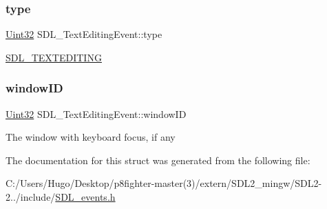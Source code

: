 \subsubsection{\texorpdfstring{type}{type}}
{\footnotesize\ttfamily \hyperlink{_s_d_l__stdinc_8h_add440eff171ea5f55cb00c4a9ab8672d}{Uint32} S\+D\+L\+\_\+\+Text\+Editing\+Event\+::type}

\hyperlink{_s_d_l__events_8h_a3b589e89be6b35c02e0dd34a55f3fccaa1b80c465df69c0b6d06f026ce7a230e3}{S\+D\+L\+\_\+\+T\+E\+X\+T\+E\+D\+I\+T\+I\+NG} \mbox{\label{struct_s_d_l___text_editing_event_a23b3e414cf7a7ccc547b7595ca930049}} 
\subsubsection{\texorpdfstring{window\+ID}{windowID}}
{\footnotesize\ttfamily \hyperlink{_s_d_l__stdinc_8h_add440eff171ea5f55cb00c4a9ab8672d}{Uint32} S\+D\+L\+\_\+\+Text\+Editing\+Event\+::window\+ID}

The window with keyboard focus, if any 

The documentation for this struct was generated from the following file\+:\begin{DoxyCompactItemize}
\item 
C\+:/\+Users/\+Hugo/\+Desktop/p8fighter-\/master(3)/extern/\+S\+D\+L2\+\_\+mingw/\+S\+D\+L2-\/2../include/\hyperlink{_s_d_l__events_8h}{S\+D\+L\+\_\+events.\+h}\end{DoxyCompactItemize}
